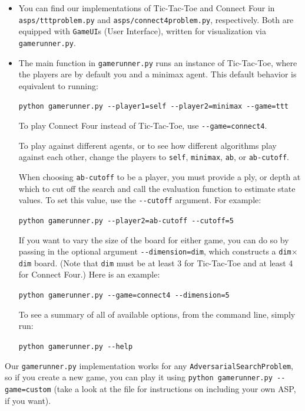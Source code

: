 \documentclass{article}
\begin{document}
\begin{itemize}
\item You can find our implementations of Tic-Tac-Toe and Connect Four in
  \verb|asps/tttproblem.py| and \verb|asps/connect4problem.py|, respectively.
  Both are equipped with \verb|GameUI|s (User Interface), written for visualization via
  \verb|gamerunner.py|.


\item The main function in \verb|gamerunner.py| runs an instance of Tic-Tac-Toe,
  where the players are by default you and a minimax agent.
  This default behavior is equivalent to running:

  \verb|python gamerunner.py --player1=self --player2=minimax --game=ttt|

  To play Connect Four instead of Tic-Tac-Toe, use \verb|--game=connect4|.

  To play against different agents, or to see how different algorithms
  play against each other, change the players to \verb|self|,
  \verb|minimax|, \verb|ab|, or \verb|ab-cutoff|.

  When choosing \verb|ab-cutoff| to be a player, you must provide a
  ply, or depth at which to cut off the search and call the evaluation
  function to estimate state values.  To set this value, use the
  \verb|--cutoff| argument. For example:

  \verb|python gamerunner.py --player2=ab-cutoff --cutoff=5|

  If you want to vary the size of the board for either game, you can
  do so by passing in the optional argument \verb|--dimension=dim|,
  which constructs a \verb|dim|$\times$\verb|dim| board. (Note
  that \verb|dim| must be at least 3 for Tic-Tac-Toe and at least 4
  for Connect Four.) Here is an example:

  \verb|python gamerunner.py --game=connect4 --dimension=5|

  To see a summary of all of available options, from the command line, simply run:

  \verb|python gamerunner.py --help|
\end{itemize}

\noindent
Our \verb|gamerunner.py| implementation works for any \verb|AdversarialSearchProblem|,
so if you create a new game, you can play it using \verb|python gamerunner.py --game=custom| (take a look at the file for instructions on including your own ASP, if you want).
\end{document}
